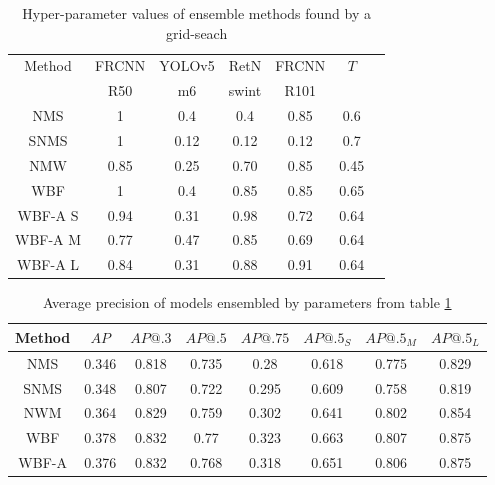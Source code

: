 \begin{table}[H]
    \begin{tabular}{|c|c|c|c|c|c|c|}
        \hline
        Method  & FRCNN & YOLOv5 & RetN  & FRCNN & $T$  \\
                & R50   & m6     & swint & R101  &      \\ \hline
        NMS     & 1     & 0.4    & 0.4   & 0.85  & 0.6  \\ \hline
        SNMS    & 1     & 0.12   & 0.12  & 0.12  & 0.7  \\ \hline
        NMW     & 0.85  & 0.25   & 0.70  & 0.85  & 0.45 \\ \hline
        WBF     & 1     & 0.4    & 0.85  & 0.85  & 0.65 \\ \hline
        WBF-A S & 0.94  & 0.31   & 0.98  & 0.72  & 0.64 \\ \hline
        WBF-A M & 0.77  & 0.47   & 0.85  & 0.69  & 0.64 \\ \hline
        WBF-A L & 0.84  & 0.31   & 0.88  & 0.91  & 0.64 \\ \hline
    \end{tabular}
    \caption{Hyper-parameter values of ensemble methods found by a grid-seach}
    \label{tab:ensemble_params:grid_search}
\end{table}


\begin{table}[H]
    \centering
    \begin{tabular}{|c|c|c|c|c|c|c|c|}
        \hline
        Method & $AP$  & $AP@.3$ & $AP@.5$ & $AP@.75$ & $AP@.5_S$ & $AP@.5_M$ & $AP@.5_L$ \\ \hline
        NMS    & 0.346 & 0.818   & 0.735   & 0.28     & 0.618     & 0.775     & 0.829     \\ \hline
        SNMS   & 0.348 & 0.807   & 0.722   & 0.295    & 0.609     & 0.758     & 0.819     \\ \hline
        NWM    & 0.364 & 0.829   & 0.759   & 0.302    & 0.641     & 0.802     & 0.854     \\ \hline
        WBF    & 0.378 & 0.832   & 0.77    & 0.323    & 0.663     & 0.807     & 0.875     \\ \hline
        WBF-A  & 0.376 & 0.832   & 0.768   & 0.318    & 0.651     & 0.806     & 0.875     \\ \hline
    \end{tabular}
    \caption{Average precision of models ensembled by parameters from table \ref{tab:ensemble_params:grid_search}}
    \label{tab:precision:grid_search}
\end{table}


